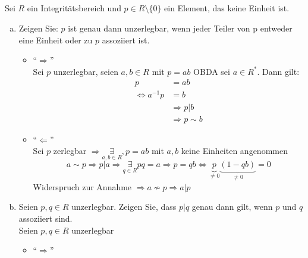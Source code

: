 \documentclass{article}
\begin{document}
\subsection{}
\color{blue}
Sei $R$ ein Integritätsbereich und $p\in R\setminus\{0\}$
ein Element, das keine Einheit ist.
\color{black}
\begin{enumerate}[(a)]
    \item
        \color{blue}
        Zeigen Sie: $p$ ist genau dann unzerlegbar, wenn
        jeder Teiler von p entweder eine Einheit oder zu
        $p$ assoziiert ist.\\
        \color{black}
        \begin{itemize}
            \item ``$\Rightarrow$''\\
                Sei $p$ unzerlegbar, seien $a,b\in R$
                mit $p=ab$ OBDA sei $a\in R^*$. Dann gilt:
                \begin{align*}
                    p&=ab\\
                    \Leftrightarrow a^{-1}p&=b\\
                    &\Rightarrow p|b\\
                    &\Rightarrow p\sim b
                \end{align*}
            \item ``$\Leftarrow$''\\
                Sei $p$ zerlegbar $\Rightarrow\underset
                {a,b\in R}\exists,p=ab$ mit $a,b$ keine
                Einheiten angenommen
                \begin{equation*}
                    a\sim p\Rightarrow p|a\Rightarrow
                    \underset{q\in R}\exists pq=a
                    \Rightarrow p=qb\Leftrightarrow
                    \underbrace{p}_{\neq 0}
                    \underbrace{(1-qb)}_{\neq 0}=0
                \end{equation*}
                Widerspruch zur Annahme $\Rightarrow a\nsim
                p\Rightarrow a|p$
        \end{itemize}
    \item
        \color{blue}
        Seien $p,q\in R$ unzerlegbar. Zeigen Sie, dass $p|q$
        genau dann gilt, wenn $p$ und $q$ assoziiert sind.\\
        \color{black}
        Seien $p,q\in R$ unzerlegbar
        \begin{itemize}
            \item ``$\Rightarrow$''\\

\end{itemize}
\end{enumerate}
\end{document}
